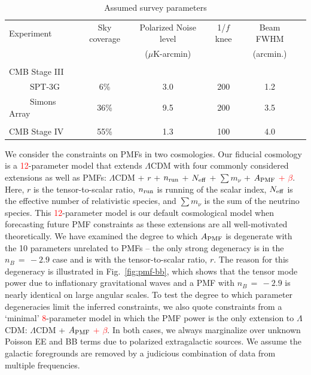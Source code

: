 \documentclass[apj]{emulateapj}
\newcommand{\apmf}{\ensuremath{A_{\rm PMF}}}
\newcommand{\lcdm}{\ensuremath{\Lambda}CDM}
\newcommand{\nrun}{\ensuremath{n_{\rm run}}}
\newcommand{\neff}{\ensuremath{N_{\rm eff}}}
\newcommand{\mnu}{\ensuremath{\sum m_\nu}}
\newcommand{\changed}[1]{\textcolor{Red}{#1}}
\begin{document}
\begin{table}[tbh]
\begin{center}
\caption{\label{tab:experiments} Assumed survey parameters}
\small
\begin{tabular}{l || c c c c c }
Experiment & Sky coverage & Polarized Noise level  & 1/$f$ knee & Beam FWHM \\
& &($\mu$K-arcmin)&&(arcmin.)\\
\hline
\tiny \\ \small
CMB Stage III & & & & \\
~~~~~SPT-3G & 6\% & 3.0 & 200 & 1.2 \\
~~~~~Simons Array & 36\% & 9.5 & 200 & 3.5 \\ 
\tiny \\ \small
CMB Stage IV & 55\% & 1.3 & 100 & 4.0 \\
\end{tabular}
 \normalsize
\end{center}
\end{table}





We consider the constraints on PMFs in two cosmologies. 
Our fiducial cosmology is a \changed{12}-parameter model that extends \lcdm{} with  four  commonly considered extensions as well as PMFs:  \lcdm{} +  $r$ + \nrun{} +  \neff{} + \mnu{} + \apmf{} \changed{ + $\beta$}. 
Here, $r$ is the tensor-to-scalar ratio, \nrun{} is running of the scalar index, \neff{} is the effective number of relativistic species, and \mnu{} is the sum of the neutrino species. 
This \changed{12}-parameter model is our default cosmological model when forecasting future PMF constraints as these extensions are all well-motivated theoretically. 
We have examined the degree to which \apmf{} is degenerate with the 10 parameters unrelated to PMFs -- the only strong degeneracy is in the $n_B\,=\,-2.9$ case and is with the tensor-to-scalar ratio, $r$. 
The reason for this degeneracy is illustrated in Fig.~\ref{fig:pmf-bb}, which shows that the tensor mode power due to inflationary gravitational waves and a PMF with $n_B\,=\,-2.9$ is nearly identical on large angular scales. 
To test the degree to which parameter degeneracies limit the inferred constraints,  we also quote constraints from a `minimal' \changed{8}-parameter model in which the PMF power is the only extension to \lcdm{}:  \lcdm{} + \apmf{} \changed{ + $\beta$}.
In both cases, we always marginalize over unknown Poisson EE and BB  terms due to polarized extragalactic sources. 
We assume the galactic foregrounds are removed by a judicious combination of data from multiple frequencies. 
\end{document}
